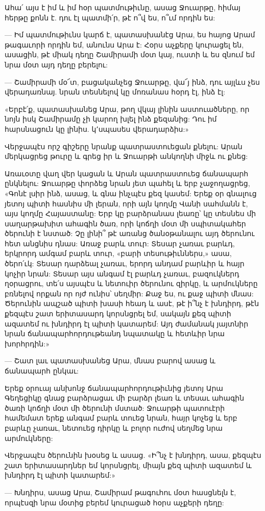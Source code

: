 \documentclass{article}
\begin{document}
{Ահա՛ այս է իմ և իմ հօր պատմութիւնը, ասաց Ջուարթը, հիմայ հերթը քոնն է. դու էլ պատմի՛ր, թէ ո՞վ ես, ո՞ւմ որդին ես:

— Իմ պատմութիւնս կարճ է, պատասխանէց Արա, ես հայոց Արամ թագաւորի որդին եմ, անունս Արա է: Հօրս աչքերը կուրացել են, ասացին, թէ միակ դեղը Շամիրամի մօտ կայ, ուստի և ես զնում եմ նրա մօտ այդ դեղը բերելու:

— Շամիրամի մօ՜տ, բացականչեց Ջուարթը, վա՜յ ինձ, դու այլևս չես վերադառնայ. նրան տեսնելով կը մոռանաս հօրդ էլ, ինձ էլ:

«Երբէ՛ք, պատասխանեց Արա, թող վկայ լինին աստուածները, որ նոյն իսկ Շամիրամը չի կարող խլել ինձ քեզանից: Դու իմ հարսնացուն կը լինիս. կ՚սպասես վերադարձիս:»

Վերջապէս որշ գիշերը նրանք պատրաստուեցան քնելու: Արան մերկացրեց թուրը և գրեց իր և Ջուարթի անկողնի միջև ու քնեց:

Առաւօտը վաղ վեր կացան և Արան պատրաստուեց ճանապարհ ընկնելու: Ջուարթը փորձեց նրան յետ պահել և երբ չաջողացրեց, «Գոնէ լսիր ինձ, ասաց, և գնա ինչպէս քեզ կասեմ: Երեք օր գնալուց յետոյ պիտի հասնիս մի լերան, որի այն կողմը Վանի սահմանն է, այս կողմը Հայաստանը: Երբ կը բարձրանաս լեառը՝ կը տեսնես մի սաղարթախիտ ահագին ծառ, որի կոճղի մօտ մի սպիտակահեր ծերունի է նստած: Չը լինի՞ թէ առանց ծանօթանալու այդ ծերունու հետ անցնիս դնաս: Առաջ բարև տուր: Տեսար չառաւ բարևդ, երկրորդ ամգամ բարև տուր, «բարի տեսութիւններս,» ասա, ծերո՛ւկ: Տեսար դարձեալ չառաւ, երորդ անդամ բարևիր և հայր կոչիր նրան: Տեսար այս անգամ էլ բարևդ չառաւ, բազուկներդ ղօրացրու, տե՛ս այսպէս և նետուիր ծերունու զիրկը, և արմուկները բռնելով որքան որ ոյժ ունիս՝ սեղմիր: Քաջ ես, ու քաջ պիտի մնաս: Ծերունին ապշած պիտի խասի հեադ և ասէ, թէ ի՞նչ է խնդիրդ, թէն քեզպէս շատ երիտասարդ կորսնցրել եմ, սակայն քեզ պիտի ազատեմ ու խնդիրդ էլ պիտի կատարեմ: Այդ ժամանակ յայտնիր նրան ճանապարհորդութեանդ նպատակը և հետևիր նրա խորհրդին:»

— Շատ լաւ պատասխանեց Արա, մնաս բարով ասաց և ճանապարհ ընկաւ:

Երեք օրուայ անխոնջ ճանապարհորդութիւնից յետոյ Արա Գեղեցիկը գնաց բարձրացաւ մի բարձր լեառ և տեսաւ ահագին ծառի կոճղի մօտ մի ծերունի մստած: Ջուարթի պատուէրի համեմատ երեք անգամ բարև տուեց նրան, հայր կոչեց և երբ բարևը չառաւ, նետուեց դիրկը և բոլոր ուժով սեղմեց նրա արմուկները:

Վերջապէս ծերունին խօսեց և ասաց. «Ի՞նչ է խնդիրդ, ասա, քեզպէս շատ երիտասարդներ եմ կորսնցրել, միայն քեզ պիտի ազատեմ և խնդիրդ էլ պիտի կատարեմ:»

— Խնդիրս, ասաց Արա, Շամիրամ թագուհու մօտ հասցնելն է, որպէսզի նրա մօտից բերեմ կուրացած հօրս աչքերի դեղը:

}
\end{document}
